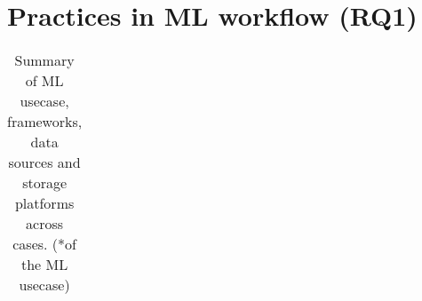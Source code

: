 \documentclass{IEEEcsmag}
\begin{document}
 










\section{\textbf{Practices in ML workflow (RQ1)}}
\label{sec:practices}











\begin{table*}[t]
 \centering
  \caption{Summary of ML usecase, frameworks, data sources and storage platforms across cases. (*of the ML usecase)}
  \begin{tabular}{p{}p{}p{3cm}p{}p{2cm}p{}p{}}
      

\end{tabular}
\end{table*}
\end{document}
